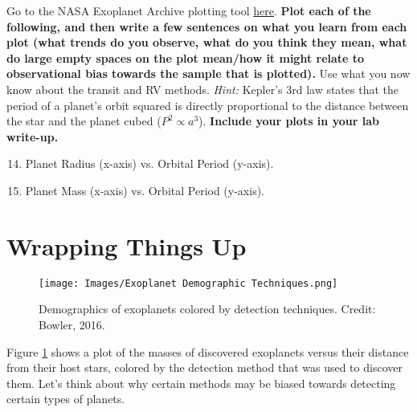 \documentclass[12pt]{article}
\begin{document}
Go to the NASA Exoplanet Archive plotting tool \href{https://exoplanetarchive.ipac.caltech.edu/cgi-bin/IcePlotter/nph-icePlotInit?mode=demo&set=confirmed}{here}.  \textbf{Plot each of the following, and then write a few sentences on what you learn from each plot (what trends do you observe, what do you think they mean, what do large empty spaces on the plot mean/how it might relate to observational bias towards the sample that is plotted).} Use what you now know about the transit and RV methods. \textit{Hint:} Kepler's 3rd law states that the period of a planet's orbit squared is directly proportional to the distance between the star and the planet cubed ($P^2 \propto a^3$). \textbf{Include your plots in your lab write-up.} 
    \begin{enumerate}
    \setcounter{enumi}{13}
        \item Planet Radius (x-axis) vs. Orbital Period (y-axis). %
        \item Planet Mass (x-axis) vs. Orbital Period (y-axis). %
    \end{enumerate}


\section{Wrapping Things Up}

\begin{figure}[h!]
    \centering
    \texttt{[image: Images/Exoplanet Demographic Techniques.png]}
    \caption{Demographics of exoplanets colored by detection techniques. Credit: Bowler, 2016.}
    \label{fig:techniques}
\end{figure}

Figure \ref{fig:techniques} shows a plot of the masses of discovered exoplanets versus their distance from their host stars, colored by the detection method that was used to discover them. Let's think about why certain methods may be biased towards detecting certain types of planets.
\end{document}
